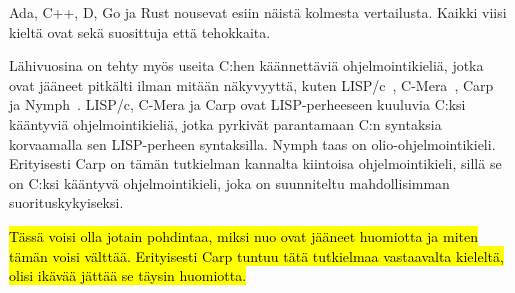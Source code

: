 Ada, C++, D, Go ja Rust nousevat esiin näistä kolmesta vertailusta. Kaikki
viisi kieltä ovat sekä suosittuja että tehokkaita.

Lähivuosina on tehty myös useita C:hen käännettäviä ohjelmointikieliä, jotka
ovat jääneet pitkälti ilman mitään näkyvyyttä, kuten LISP/c~\citep{clisp1},
C-Mera~\citep{clisp2}, Carp~\citep{clisp3} ja Nymph~\citep{nymph}. LISP/c,
C-Mera ja Carp ovat LISP-perheeseen kuuluvia C:ksi kääntyviä ohjelmointikieliä,
jotka pyrkivät parantamaan C:n syntaksia korvaamalla sen LISP-perheen
syntaksilla. Nymph taas on olio-ohjelmointikieli. Erityisesti Carp on tämän
tutkielman kannalta kiintoisa ohjelmointikieli, sillä se on C:ksi kääntyvä
ohjelmointikieli, joka on suunniteltu mahdollisimman suorituskykyiseksi.

\hl{Tässä voisi olla jotain pohdintaa, miksi nuo ovat jääneet huomiotta ja
miten tämän voisi välttää. Erityisesti Carp tuntuu tätä tutkielmaa vastaavalta
kieleltä, olisi ikävää jättää se täysin huomiotta.}
